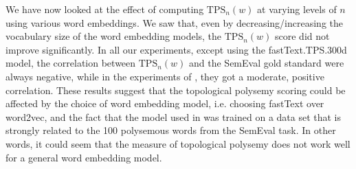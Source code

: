 We have now looked at the effect of computing $\text{TPS}_n(w)$ at varying levels of $n$ using various word embeddings. We saw that, even by decreasing/increasing the vocabulary size of the word embedding models, the $\text{TPS}_n(w)$ score did not improve significantly. In all our experiments, except using the fastText.TPS.300d model, the correlation between $\text{TPS}_n(w)$ and the SemEval gold standard were always negative, while in the experiments of \cite{jakubowski2020topology}, they got a moderate, positive correlation. These results suggest that the topological polysemy scoring could be affected by the choice of word embedding model, i.e. choosing fastText over word2vec, and the fact that the model used in \cite{jakubowski2020topology} was trained on a data set that is strongly related to the 100 polysemous words from the SemEval task. In other words, it could seem that the measure of topological polysemy does not work well for a general word embedding model.

